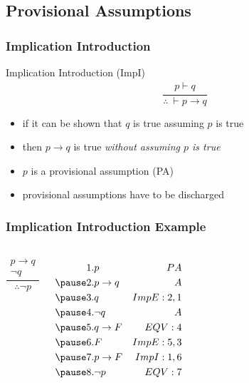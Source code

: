 \documentclass[dvipsnames]{beamer}
\begin{document}
\subsection{Provisional Assumptions}

\begin{frame}
  \frametitle{Implication Introduction}

  \begin{block}{Implication Introduction (ImpI)}
    \[
    \frac
      {
        \begin{array}{c}
          p \vdash q
        \end{array}
      }
      {
        \therefore ~ \vdash p \rightarrow q
      }
    \]
  \end{block}

  \begin{itemize}
    \item if it can be shown that $q$ is true assuming $p$ is true
    \item then $p \rightarrow q$ is true \emph{without assuming $p$ is true}

    \pause
    \medskip
    \item $p$ is a \alert{provisional assumption} (PA)
    \item provisional assumptions have to be \alert{discharged}
  \end{itemize}
\end{frame}

\begin{frame}
  \frametitle{Implication Introduction Example}

  \begin{columns}
    \[
    \frac
      {
        \begin{array}{c}
          p \rightarrow q\\
          \neg q
        \end{array}
      }
      {
        \therefore \neg p
      }
    \]

    \pause
    \begin{eqnarray*}
      1. & p               & PA\\
      \pause
      2. & p \rightarrow q & A\\
      \pause
      3. & q               & ImpE:2,1\\
      \pause
      4. & \neg q          & A\\
      \pause
      5. & q \rightarrow F & EQV:4\\
      \pause
      6. & F               & ImpE:5,3\\
      \pause
      7. & p \rightarrow F & ImpI:1,6\\
      \pause
      8. & \neg p          & EQV:7\\
    \end{eqnarray*}
  \end{columns}
\end{frame}
\end{document}
